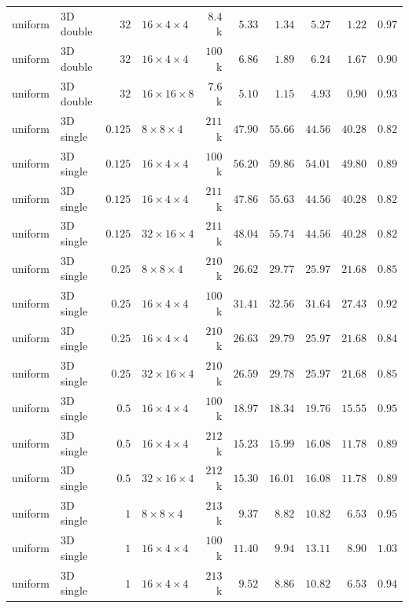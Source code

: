 {\begin{longtable}{llrlrrrrrr}
    uniform & 3D double & $32$ & $16{\times}4{\times}4$ & $8.4$k & $5.33$ & $1.34$ & $5.27$ & $1.22$ & $0.97$ \\
    uniform & 3D double & $32$ & $16{\times}4{\times}4$ & $100$k & $6.86$ & $1.89$ & $6.24$ & $1.67$ & $0.90$ \\
    uniform & 3D double & $32$ & $16{\times}16{\times}8$ & $7.6$k & $5.10$ & $1.15$ & $4.93$ & $0.90$ & $0.93$ \\
    \midrule
    uniform & 3D single & $0.125$ & $8{\times}8{\times}4$ & $211$k & $47.90$ & $55.66$ & $44.56$ & $40.28$ & $0.82$ \\
    uniform & 3D single & $0.125$ & $16{\times}4{\times}4$ & $100$k & $56.20$ & $59.86$ & $54.01$ & $49.80$ & $0.89$ \\
    uniform & 3D single & $0.125$ & $16{\times}4{\times}4$ & $211$k & $47.86$ & $55.63$ & $44.56$ & $40.28$ & $0.82$ \\
    uniform & 3D single & $0.125$ & $32{\times}16{\times}4$ & $211$k & $48.04$ & $55.74$ & $44.56$ & $40.28$ & $0.82$ \\
    uniform & 3D single & $0.25$ & $8{\times}8{\times}4$ & $210$k & $26.62$ & $29.77$ & $25.97$ & $21.68$ & $0.85$ \\
    uniform & 3D single & $0.25$ & $16{\times}4{\times}4$ & $100$k & $31.41$ & $32.56$ & $31.64$ & $27.43$ & $0.92$ \\
    uniform & 3D single & $0.25$ & $16{\times}4{\times}4$ & $210$k & $26.63$ & $29.79$ & $25.97$ & $21.68$ & $0.84$ \\
    uniform & 3D single & $0.25$ & $32{\times}16{\times}4$ & $210$k & $26.59$ & $29.78$ & $25.97$ & $21.68$ & $0.85$ \\
    uniform & 3D single & $0.5$ & $16{\times}4{\times}4$ & $100$k & $18.97$ & $18.34$ & $19.76$ & $15.55$ & $0.95$ \\
    uniform & 3D single & $0.5$ & $16{\times}4{\times}4$ & $212$k & $15.23$ & $15.99$ & $16.08$ & $11.78$ & $0.89$ \\
    uniform & 3D single & $0.5$ & $32{\times}16{\times}4$ & $212$k & $15.30$ & $16.01$ & $16.08$ & $11.78$ & $0.89$ \\
    uniform & 3D single & $1$ & $8{\times}8{\times}4$ & $213$k & $9.37$ & $8.82$ & $10.82$ & $6.53$ & $0.95$ \\
    uniform & 3D single & $1$ & $16{\times}4{\times}4$ & $100$k & $11.40$ & $9.94$ & $13.11$ & $8.90$ & $1.03$ \\
    uniform & 3D single & $1$ & $16{\times}4{\times}4$ & $213$k & $9.52$ & $8.86$ & $10.82$ & $6.53$ & $0.94$ \\

\end{longtable}}
